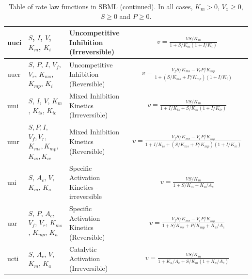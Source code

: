 \documentclass[10pt]{cekarticle}
\begin{document}
\begin{table}[ht]
\begin{tabular}{|p{0.5in}|>{\raggedright}m{0.77in}|>{\raggedright}m{1.5in}|m{3.1in}|}
uuci & $S$, $I$, $V$, $K_m$, $K_i$ & Uncompetitive Inhibition
(Irreversible) &
\begin{gather*}
v = \frac{V S/K_m}{1 + S/K_m \left( 1 + I/K_i\right)}
\end{gather*}
\\ \hline

uucr & $S$, $P$, $I$, $V_f$, $V_r$, $K_{ms}$, $K_{mp}$, $K_i$ &
Uncompetitive Inhibition (Reversible) &
\begin{gather*}
v = \frac{V_f S/K_{ms} - V_r
P/K_{mp}}{1 + \left( S/K_{ms} + P/K_{mp} \right) \left( 1 + I/K_i\right) }
\end{gather*}
\\ \hline

umi & $S$, $I$, $V$, $K_m$, $K_{is}$, $K_{ic}$ & Mixed Inhibition
Kinetics (Irreversible) &
\begin{gather*}
v = \frac{V S/K_m}{1 + I/K_{is} + S/K_m \left( 1 + I/K_{ic} \right) }
\end{gather*}
\\ \hline

umr & $ S, P, I,$ $ V_f, V_r, $ $ K_{ms}, K_{mp}, $ $ K_{is}, K_{ic} $ & Mixed
Inhibition Kinetics (Reversible) &
\begin{gather*}
v = \frac{V_f S/K_{ms} - V_r
P/K_{mp}}{1 + I/K_{is} + \left( S/K_{ms} + P/K_{mp} \right) \left( 1 + I/K_{ic}
\right) }
\end{gather*}
\\ \hline

uai & $S$, $A_c$, $V$, $K_m$, $K_a$ & Specific Activation Kinetics -
irreversible &
\begin{gather*}
v = \frac{V S/K_m}{1 + S/K_m + K_a/A_c}
\end{gather*}
\\ \hline

uar & $S$, $P$, $A_c$, $V_f$, $V_r$, $K_{ms}$, $K_{mp}$, $K_a$ & Specific
Activation Kinetics (Reversible) &
\begin{gather*}
v = \frac{V_f S/K_{ms} - V_r P/K_{mp}}{1 + S/K_{ms} + P/K_{mp} + K_a/A_c}
\end{gather*}
\\ \hline

ucti & $S$, $A_c$, $V$, $K_m$, $K_a$ & Catalytic Activation
(Irreversible) &
\begin{gather*}
v = \frac{V S/K_m}{1 + K_a/A_c + S/K_m \left( 1 + K_a/A_c\right)}
\end{gather*}
\\ \hline

\end{tabular}
\caption{Table of rate law functions in SBML (continued).  In all cases, $K_m > 0$, $V_x \geq 0$, $S
  \geq 0$ and $P \geq 0$.}
\end{table}
\end{document}
